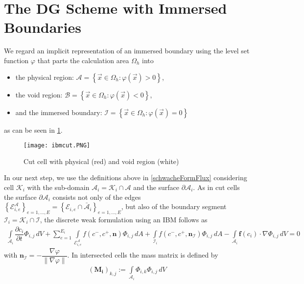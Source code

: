 	\section{The DG Scheme with Immersed Boundaries}
	We regard an implicit representation of an immersed boundary using the level set function $\varphi$ that parts the calculation area $\Omega_h$ into 
	\begin{itemize}
		\item the physical region:  $\mathcal{A} = \left\{\vec{x} \in \Omega_h : \varphi (\vec{x}) > 0 \right\}$,
		\item the void region:  $\mathcal{B} = \left\{ \vec{x}\in \Omega_h : \varphi (\vec{x}) < 0 \right\}$, 
		\item and the immersed boundary: $\mathcal{I} = \left\{ \vec{x}\in \Omega_h : \varphi (\vec{x}) = 0 \right\}$
	\end{itemize} 
	as can be seen in  \cref{fig:cutcell}.
	\begin{figure}[htp]
		\centering
		\texttt{[image: ibmcut.PNG]}
		\caption{Cut cell with physical (red) and void region (white) \cite{paper}}\label{fig:cutcell}
	\end{figure}
	In our next step, we use the definitions above in \eqref{schwacheFormFlux} considering cell $\mathcal{K}_i$ with the sub-domain $\mathcal{A}_i = \mathcal{K}_i \cap \mathcal{A}$ and the surface $\partial \mathcal{A}_i$. As in cut cells the surface $\partial \mathcal{A}_i$ consists not only of the edges $\left\{\mathcal{E}_{i,e}^\mathcal{A} \right\}_{e = 1, ..., E} = \left\{\mathcal{E}_{i,e} \cap \bar{\mathcal{A}}_i \right\}_{e = 1, ..., E}$, but also of the boundary segment $\mathcal{I}_i = \mathcal{K}_i \cap \mathcal{I}$, the discrete weak formulation using an IBM follows as
	\begin{align}
	\int\limits_{\mathcal{A}_i} \dfrac{\partial c_i}{\partial t}\Phi_{i,j} \, dV +
	\sum_{e=1}^{E_i}\int\limits_{\mathcal{E}_{i,e}^\mathcal{A}} f \left( c^-, c^+, \mathbf{n} \right) \Phi_{i,j} \, dA + \int\limits_{\mathcal{I}_{i}} f \left( c^-, c^+, \mathbf{n}_\mathcal{I} \right) \Phi_{i,j} \, dA - \int\limits_{\mathcal{A}_i} \boldsymbol{f}\left(c_i\right) \cdot \nabla\Phi_{i,j} \, dV = 0
	\label{schwacheFormIBM}
	\end{align}
	with $\mathbf{n}_\mathcal{I} = - \dfrac{\nabla\varphi}{\| \nabla\varphi \|}$.
	In intersected cells the mass matrix is defined by
	\begin{align}
		(\mathbf{M_i})_{k,j} := \int\limits_{\mathcal{A}_i}\Phi_{i,k}\Phi_{i,j}\, dV
	\end{align}
